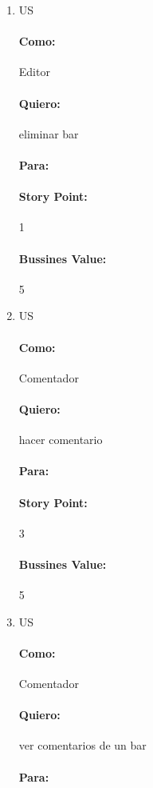 \begin{enumerate}
 \item US
\paragraph{Como:} Editor
\paragraph{Quiero:} eliminar bar
\paragraph{Para:}
\paragraph{Story Point:}1 
\paragraph{Bussines Value:}5



 \item US
\paragraph{Como:} Comentador
\paragraph{Quiero:} hacer comentario
\paragraph{Para:}
\paragraph{Story Point:}3
\paragraph{Bussines Value:}5


 \item US
\paragraph{Como:} Comentador
\paragraph{Quiero:}ver comentarios de un bar 
\paragraph{Para:}

\end{enumerate}
